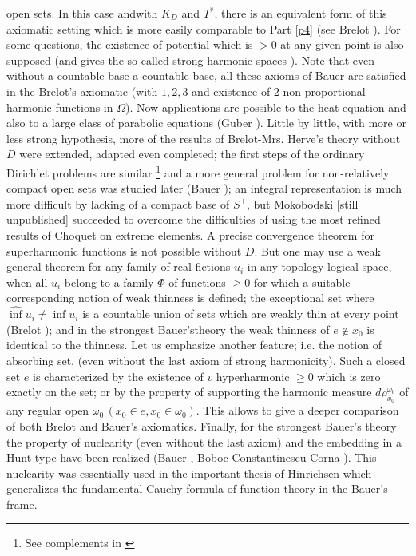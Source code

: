 open sets. In this case and\pageoriginale with $K_D$ and $T^*$, there is an
equivalent form of this axiomatic setting which is more easily
comparable to Part \ref{p4} (see Brelot \cite{16}). For some questions, the
existence of potential which is $>0$ at any given point is also
supposed (and gives the so called strong harmonic spaces \cite{4}). Note
that even without a countable base a countable base, all these axioms
of Bauer are satisfied in the Brelot's axiomatic (with $1,2,3$ and
existence of $2$ non proportional harmonic functions in $\Omega$). Now
applications are possible to the heat equation and also to a large
class of parabolic equations (Guber \cite{43}). Little by little, with
more or less strong hypothesis, more of the results of
Brelot-Mrs. Herve's theory without $D$ were extended, adapted even
completed; the first steps of the ordinary  Dirichlet problems are
similar \footnote{ See complements in \cite{50}} and a more general
problem for non-relatively compact open sets was studied later (Bauer
\cite{5}); an integral representation is much more difficult by lacking
of a compact base of $S^+$, but Mokobodski [still unpublished]
succeeded to overcome the difficulties of using the most refined
results of Choquet on extreme elements. A precise convergence theorem
for superharmonic functions is not possible without $D$. But one may
use a weak general theorem for any family of real fictions $u_i$ in
any topology logical space, when all $u_i$ belong to a family $\Phi$
of functions $\geq 0$ for which a suitable corresponding notion of
weak thinness is defined; the exceptional set where $\hat{\inf} u_i
\neq \inf u_i$ is a countable union of sets which are weakly thin at
every point (Brelot \cite{16}); and in the strongest Bauer's\pageoriginale theory the
weak thinness of $e \notin x_0$ is identical to the thinness. Let us
emphasize another feature; i.e. the notion of absorbing set. (even
without the last axiom of strong harmonicity). Such a closed set $e$
is characterized by the existence of $v$ hyperharmonic $\geq 0$ which
is zero exactly on the set; or by the property of supporting the
harmonic measure $d \rho^{\omega_0}_{x_0}$ of any regular open
$\omega_0 \,(x_0 \in e, x_0 \in \omega_0)$. This allows to give a deeper
comparison of both Brelot and Bauer's axiomatics. Finally, for the
strongest Bauer's theory the property of nuclearity (even without the
last axiom) and the embedding in a Hunt type have been realized
(\resp Bauer \cite{4}, Boboc-Constantinescu-Corna \cite{10}). This nuclearity
was essentially used in the important thesis of Hinrichsen \cite{48}
which generalizes the fundamental Cauchy formula of function theory in
the Bauer's frame. 

